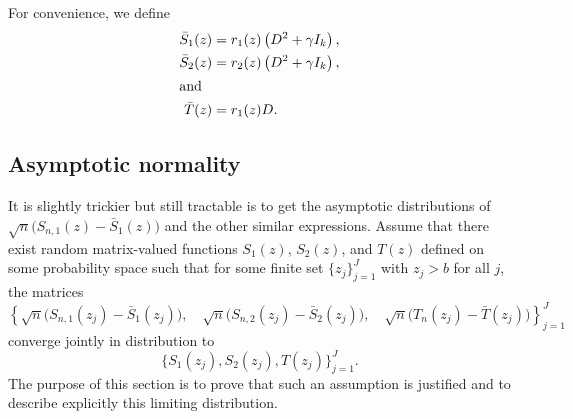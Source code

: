 For convenience, we define
\begin{align*}
    \bar S_1(z) &= r_1(z) \left( D^2 + \gamma I_k \right), \\
    \bar S_2(z) &= r_2(z) \left( D^2 + \gamma I_k \right), \\
\intertext{and}
    \bar T(z) &= r_1(z) D.
\end{align*}

\subsection{Asymptotic normality}

It is slightly trickier but still tractable is to get the asymptotic distributions
of $\sqrt{n} \big( S_{n,1}(z) - \bar S_1 (z) \big)$ and the other similar expressions.
Assume that there exist random matrix-valued functions 
$S_1(z)$, $S_2(z)$, and $T(z)$ defined on some probability space
such that for some finite set $\{ z_j \}_{j=1}^J$ with $z_j > b$ for all $j$, 
the matrices
\begin{equation*}
    \left\{ 
        \sqrt{n} \big( S_{n,1}(z_j) - \bar S_1 (z_j) \big), \quad
        \sqrt{n} \big( S_{n,2}(z_j) - \bar S_2 (z_j) \big), \quad
        \sqrt{n} \big( T_n(z_j) - \bar T (z_j) \big) 
    \right\}_{j=1}^{J}
\end{equation*}
converge jointly in distribution to
\[
    \Big\{
        S_1(z_j), S_2(z_j), T(z_j)
    \Big\}_{j=1}^{J}.
\]
The purpose of this section is to prove that such an assumption is justified
and to describe explicitly this limiting distribution. 

